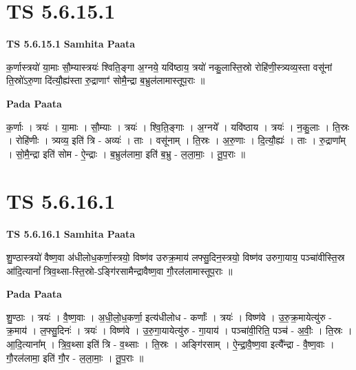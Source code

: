 \documentclass[17pt]{extarticle}
\begin{document}
\section{ TS 5.6.15.1 }

\textbf{TS 5.6.15.1 } \newline
\textbf{Samhita Paata} \newline

क॒र्णास्त्रयो॑ या॒माः सौ॒म्यास्त्रयः॑ श्विति॒ङ्गा अ॒ग्नये॒ यवि॑ष्ठाय॒ त्रयो॑ नकु॒लास्ति॒स्रो रोहि॑णी॒स्त्र्यव्य॒स्ता वसू॑नां ति॒स्रो॑ऽरु॒णा दि॑त्यौ॒ह्य॑स्ता रु॒द्राणाꣳ॑ सोमै॒न्द्रा ब॒भ्रुल॑लामास्तूप॒राः ॥ \newline

\textbf{Pada Paata} \newline

क॒र्णाः । त्रयः॑ । या॒माः । सौ॒म्याः । त्रयः॑ । श्वि॒ति॒ङ्गाः । अ॒ग्नये᳚ । यवि॑ष्ठाय । त्रयः॑ । न॒कु॒लाः । ति॒स्रः । रोहि॑णीः । त्र्यव्य॒ इति॑ त्रि - अव्यः॑ । ताः । वसू॑नाम् । ति॒स्रः । अ॒रु॒णाः । दि॒त्यौ॒ह्यः॑ । ताः । रु॒द्राणा᳚म् । सो॒मै॒न्द्रा इति॑ सोम - ऐ॒न्द्राः । ब॒भ्रुल॑लामा॒ इति॑ ब॒भ्रु - ल॒ला॒माः॒ । तू॒प॒राः ॥  \newline





\section{ TS 5.6.16.1 }

\textbf{TS 5.6.16.1 } \newline
\textbf{Samhita Paata} \newline

शु॒ण्ठास्त्रयो॑ वैष्ण॒वा अ॑धीलोध॒कर्णा॒स्त्रयो॒ विष्ण॑व उरुक्र॒माय॑ लफ्सु॒दिन॒स्त्रयो॒ विष्ण॑व उरुगा॒याय॒ पञ्चा॑वीस्ति॒स्र आ॑दि॒त्यानां᳚ त्रिव॒थ्सा-स्ति॒स्रो-ऽङ्गि॑रसामैन्द्रावैष्ण॒वा गौ॒रल॑लामास्तूप॒राः ॥ \newline

\textbf{Pada Paata} \newline

शु॒ण्ठाः । त्रयः॑ । वै॒ष्ण॒वाः । अ॒धी॒लो॒ध॒कर्णा॒ इत्य॑धीलोध - कर्णाः᳚ । त्रयः॑ । विष्ण॑वे । उ॒रु॒क्र॒मायेत्यु॑रु - क्र॒माय॑ । ल॒फ्सु॒दिनः॑ । त्रयः॑ । विष्ण॑वे । उ॒रु॒गा॒यायेत्यु॑रु - गा॒याय॑ । पञ्चा॑वी॒रिति॒ पञ्च॑ - अ॒वीः॒ । ति॒स्रः । आ॒दि॒त्याना᳚म् । त्रि॒व॒थ्सा इति॑ त्रि - व॒थ्साः । ति॒स्रः । अङ्गि॑रसाम् । ऐ॒न्द्रा॒वै॒ष्ण॒वा इत्यै᳚न्द्रा - वै॒ष्ण॒वाः । गौ॒रल॑लामा॒ इति॑ गौ॒र - ल॒ला॒माः॒ । तू॒प॒राः ॥  \newline
\end{document}
